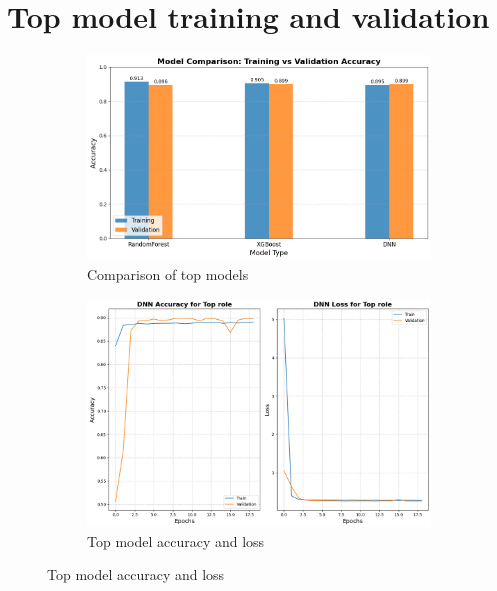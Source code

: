 \documentclass[12pt, a4paper]{article}
\begin{document}
\section{Top model training and validation}\label{sec:top_model_training}
\begin{figure}[!ht]
    \centering
    \begin{subfigure}[b]{0.8\textwidth}
        \centering
        \includegraphics[width=\textwidth]{figures/2_top_model_comparison.png}
        \caption{Comparison of top models}
    \end{subfigure}
    \begin{subfigure}[b]{0.8\textwidth}
        \centering
        \includegraphics[width=\textwidth]{figures/2_top_model_acc_loss.png}
        \caption{Top model accuracy and loss}
    \end{subfigure}
\end{figure}

\clearpage
\end{document}
